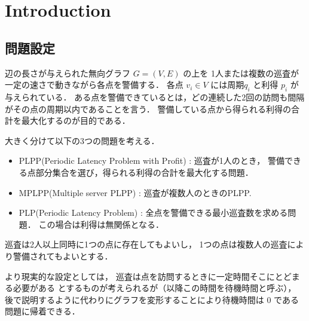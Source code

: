 
\newcommand{\shuki}  {周期}
\newcommand{\server} {巡査}


\section{Introduction}



\subsection{問題設定}
辺の長さが与えられた無向グラフ $G = (V,E)$ の上を
1人または複数の\server が一定の速さで動きながら各点を警備する．
各点 $v_i \in V$ には\shuki $q_i$ と利得 $p_i$ が与えられている．
ある点を警備できているとは，どの連続した2回の訪問も間隔がその点の\shuki 以内であることを言う．
警備している点から得られる利得の合計を最大化するのが目的である．




大きく分けて以下の3つの問題を考える．
\begin{itemize}
	\item
	PLPP(Periodic Latency Problem with Profit) : 
	\server が1人のとき，
	警備できる点部分集合を選び，得られる利得の合計を最大化する問題．
	\item
	MPLPP(Multiple server PLPP) :
	\server が複数人のときのPLPP.
	\item
	PLP(Periodic Latency Problem) : 
	全点を警備できる最小\server 数を求める問題．
	この場合は利得は無関係となる．
\end{itemize}

\server は2人以上同時に1つの点に存在してもよいし，
1つの点は複数人の\server により警備されてもよいとする．
\cite{coene2011charlemagne}

より現実的な設定としては，
\server は点を訪問するときに一定時間そこにとどまる必要がある
とするものが考えられるが（以降この時間を待機時間と呼ぶ），
後で説明するように代わりにグラフを変形することにより待機時間は $0$ である問題に帰着できる．



